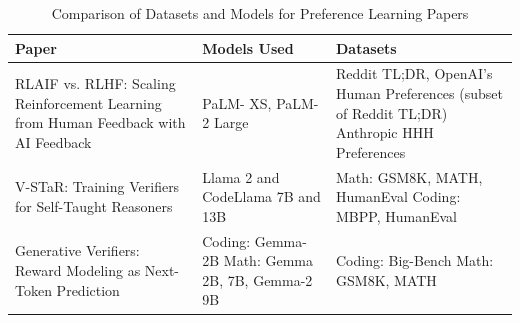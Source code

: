 \clearpage
\begin{table}[t]
    \centering
    \caption{Comparison of Datasets and Models for Preference Learning Papers}
    \label{tab:comparison}
    \renewcommand{\arraystretch}{1.5}  %
    \small
    \begin{tabular}{|p{4cm}|p{4cm}|p{8cm}|}
        \hline
        \textbf{Paper}                                                                                                              & \textbf{Models Used}                                                                                                   & \textbf{Datasets}                                                                                                                                                                                                            \\
        \hline
        RLAIF vs. RLHF: Scaling Reinforcement Learning from Human Feedback with AI Feedback \autocite{lee2024rlaifvsrlhfscaling}    & PaLM- XS, PaLM-2 Large                                                                                                 & Reddit TL;DR, \newline OpenAI's Human Preferences (subset of Reddit TL;DR) \newline Anthropic HHH Preferences                                                                                                                \\
        \hline
        V-STaR: Training Verifiers for Self-Taught Reasoners \autocite{hosseini2024vstartrainingverifiersselftaught}                & Llama 2 and CodeLlama 7B and 13B                                                                                       & Math: GSM8K, MATH, HumanEval \newline Coding: MBPP, HumanEval                                                                                                                                                                \\
        \hline
        Generative Verifiers: Reward Modeling as Next-Token Prediction \autocite{zhang2024generativeverifiersrewardmodeling}        & Coding: Gemma-2B \newline Math: Gemma 2B, 7B, Gemma-2 9B                                                               & Coding: Big-Bench \newline Math: GSM8K, MATH                                                                                                                                                                                 \\

\end{tabular}
\end{table}
